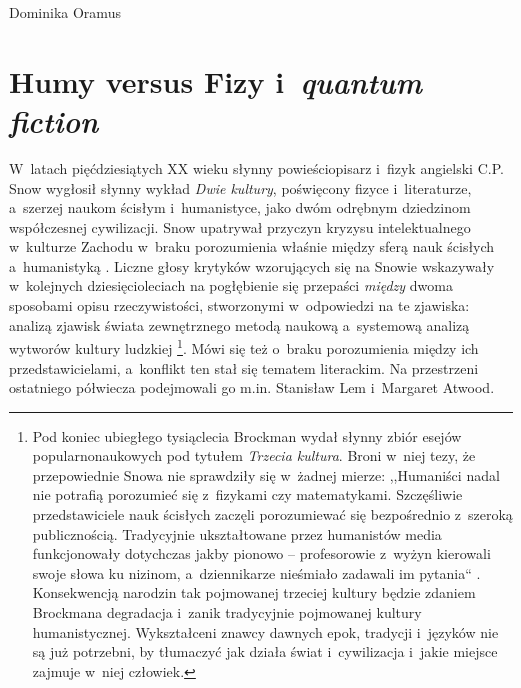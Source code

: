\begin{artplenv}{Dominika Oramus}
\section*{Humy versus Fizy i~\textit{quantum fiction}}
W~latach pięćdziesiątych XX wieku słynny powieściopisarz i~fizyk angielski C.P. Snow wygłosił słynny wykład \textit{Dwie kultury}, poświęcony fizyce i~literaturze, a~szerzej naukom ścisłym i~humanistyce, jako dwóm odrębnym dziedzinom współczesnej cywilizacji. Snow upatrywał przyczyn kryzysu intelektualnego w~kulturze Zachodu w~braku porozumienia właśnie między sferą nauk ścisłych a~humanistyką
\parencite[][]{snow_dwie_1999}. %
 Liczne głosy krytyków wzorujących się na Snowie wskazywały w~kolejnych dziesięcioleciach na pogłębienie się przepaści \textit{między} dwoma sposobami opisu rzeczywistości, stworzonymi w~odpowiedzi na te zjawiska: analizą zjawisk świata zewnętrznego metodą naukową a~systemową analizą wytworów kultury ludzkiej 
\parencite[zob. np.][]{weiner_postnaturalizm_2018}%
\footnote{Pod koniec ubiegłego tysiąclecia Brockman wydał słynny zbiór esejów popularnonaukowych pod tytułem \textit{Trzecia kultura}. Broni w~niej tezy, że przepowiednie Snowa nie sprawdziły się w~żadnej mierze: ,,Humaniści nadal nie potrafią porozumieć się z~fizykami czy matematykami. Szczęśliwie przedstawiciele nauk ścisłych zaczęli porozumiewać się bezpośrednio z~szeroką publicznością. Tradycyjnie ukształtowane przez humanistów media funkcjonowały dotychczas jakby pionowo -- profesorowie z~wyżyn kierowali swoje słowa ku nizinom, a~dziennikarze nieśmiało zadawali im pytania`` 
\parencite[][s.~17]{brockman_trzecia_1996}. %
 Konsekwencją narodzin tak pojmowanej trzeciej kultury będzie zdaniem Brockmana degradacja i~zanik tradycyjnie pojmowanej kultury humanistycznej. Wykształceni znawcy dawnych epok, tradycji i~języków nie są już potrzebni, by tłumaczyć jak działa świat i~cywilizacja i~jakie miejsce zajmuje w~niej człowiek.}. Mówi się też o~braku porozumienia między ich przedstawicielami, a~konflikt ten stał się tematem literackim. Na przestrzeni ostatniego półwiecza podejmowali go m.in. Stanisław Lem i~Margaret Atwood.


\end{artplenv}
